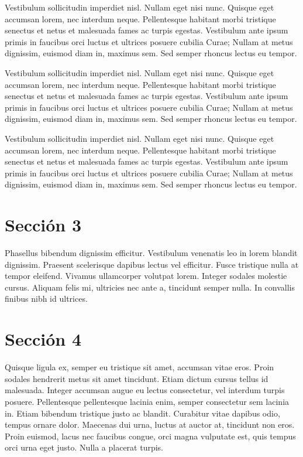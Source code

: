 	Vestibulum sollicitudin imperdiet nisl. Nullam eget nisi nunc. Quisque eget accumsan lorem, nec interdum neque. Pellentesque habitant morbi tristique senectus et netus et malesuada fames ac turpis egestas. Vestibulum ante ipsum primis in faucibus orci luctus et ultrices posuere cubilia Curae; Nullam at metus dignissim, euismod diam in, maximus sem. Sed semper rhoncus lectus eu tempor.
	
	Vestibulum sollicitudin imperdiet nisl. Nullam eget nisi nunc. Quisque eget accumsan lorem, nec interdum neque. Pellentesque habitant morbi tristique senectus et netus et malesuada fames ac turpis egestas. Vestibulum ante ipsum primis in faucibus orci luctus et ultrices posuere cubilia Curae; Nullam at metus dignissim, euismod diam in, maximus sem. Sed semper rhoncus lectus eu tempor.
	
	Vestibulum sollicitudin imperdiet nisl. Nullam eget nisi nunc. Quisque eget accumsan lorem, nec interdum neque. Pellentesque habitant morbi tristique senectus et netus et malesuada fames ac turpis egestas. Vestibulum ante ipsum primis in faucibus orci luctus et ultrices posuere cubilia Curae; Nullam at metus dignissim, euismod diam in, maximus sem. Sed semper rhoncus lectus eu tempor.
	
	\section{Sección 3}
	
	Phasellus bibendum dignissim efficitur. Vestibulum venenatis leo in lorem blandit dignissim. Praesent scelerisque dapibus lectus vel efficitur. Fusce tristique nulla at tempor eleifend. Vivamus ullamcorper volutpat lorem. Integer sodales molestie cursus. Aliquam felis mi, ultricies nec ante a, tincidunt semper nulla. In convallis finibus nibh id ultrices.

	\section{Sección 4}
	Quisque ligula ex, semper eu tristique sit amet, accumsan vitae eros. Proin sodales hendrerit metus sit amet tincidunt. Etiam dictum cursus tellus id malesuada. Integer accumsan augue eu lectus consectetur, vel interdum turpis posuere. Pellentesque pellentesque lacinia enim, semper consectetur sem lacinia in. Etiam bibendum tristique justo ac blandit. Curabitur vitae dapibus odio, tempus ornare dolor. Maecenas dui urna, luctus at auctor at, tincidunt non eros. Proin euismod, lacus nec faucibus congue, orci magna vulputate est, quis tempus orci urna eget justo. Nulla a placerat turpis.
